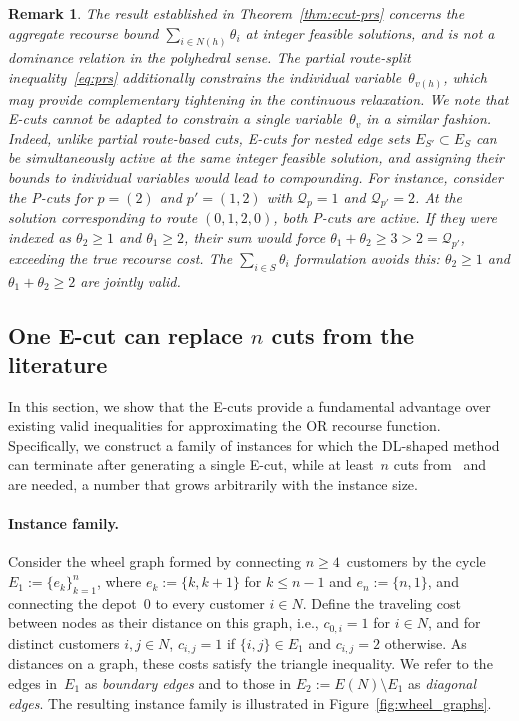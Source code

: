 \documentclass{article}
\newtheorem{remark}{Remark}
\begin{document}
{\begin{remark}\label{rem:dominance}
The result established in Theorem~\ref{thm:ecut-prs} concerns the aggregate recourse bound $\sum_{i \in N(h)}\theta_i$ at integer feasible solutions, and is not a dominance relation in the polyhedral sense. The partial route-split inequality~\eqref{eq:prs} additionally constrains the individual variable~$\theta_{v(h)}$, which may provide complementary tightening in the continuous relaxation. We note that E-cuts cannot be adapted to constrain a single variable~$\theta_v$ in a similar fashion. Indeed, unlike partial route-based cuts, E-cuts for nested edge sets $E_{S'} \subset E_S$ can be simultaneously active at the same integer feasible solution, and assigning their bounds to individual variables would lead to compounding. For instance, consider the P-cuts for $p = (2)$ and $p' = (1,2)$ with $\mathcal{Q}_p = 1$ and $\mathcal{Q}_{p'} = 2$. At the solution corresponding to route $(0,1,2,0)$, both P-cuts are active. If they were indexed as $\theta_2 \geq 1$ and $\theta_1 \geq 2$, their sum would force $\theta_1 + \theta_2 \geq 3 > 2 = \mathcal{Q}_{p'}$, exceeding the true recourse cost. The $\sum_{i \in S}\theta_i$ formulation avoids this: $\theta_2 \geq 1$ and $\theta_1 + \theta_2 \geq 2$ are jointly valid.
\end{remark}


\subsection{One E-cut can replace $n$ cuts from the literature} \label{sec:E-cuts:wheel}

In this section, we show that the E-cuts provide a fundamental advantage over existing valid inequalities for approximating the OR recourse function. Specifically, we construct a family of instances for which the DL-shaped method can terminate after generating a single E-cut, while at least~$n$ cuts from~\cite{hoogendoorn2023improved} and~\cite{parada2024disaggregated} are needed, a number that grows arbitrarily with the instance size.

\paragraph{Instance family.} Consider the wheel graph formed by connecting $n\geq4$~customers by the cycle $E_1 := \{ e_k \}_{k=1}^n$, where $e_k := \{k, k+1\}$ for $k \leq n-1$ and $e_{n} := \{n,1\}$, and connecting the depot~$0$ to every customer $i \in N$. Define the traveling cost between nodes as their distance on this graph, i.e., $c_{0,i}=1$ for $i\in N$, and for distinct customers $i,j \in N$, $c_{i,j}=1$ if $\{i,j\}\in E_1$ and $c_{i,j}=2$ otherwise. As distances on a graph, these costs satisfy the triangle inequality. We refer to the edges in~$E_1$ as \emph{boundary edges} and to those in $E_2 := E(N) \setminus E_1$ as \emph{diagonal edges}. The resulting instance family is illustrated in Figure~\ref{fig:wheel_graphs}.

}
\end{document}
